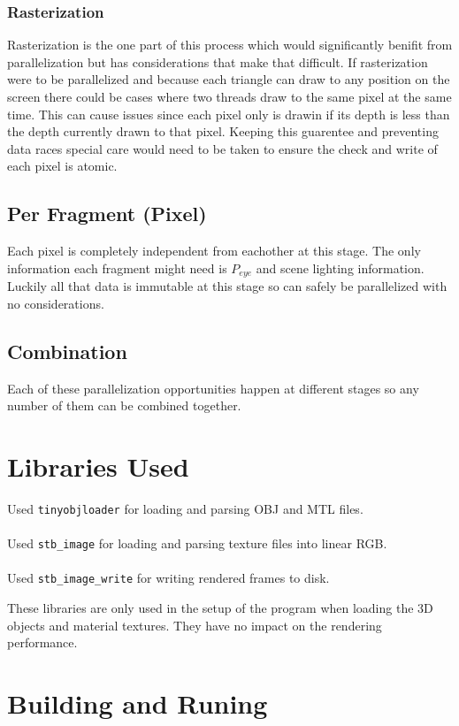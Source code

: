 \documentclass[12pt]{article}
\begin{document}
\subsubsection{Rasterization}
Rasterization is the one part of this process which would significantly benifit from parallelization but has considerations that make that difficult. If rasterization were to be parallelized and because each triangle can draw to any position on the screen there could be cases where two threads draw to the same pixel at the same time. This can cause issues since each pixel only is drawin if its depth is less than the depth currently drawn to that pixel. Keeping this guarentee and preventing data races special care would need to be taken to ensure the check and write of each pixel is atomic.

\subsection{Per Fragment (Pixel)}
Each pixel is completely independent from eachother at this stage. The only information each fragment might need is $P_{eye}$ and scene lighting information. Luckily all that data is immutable at this stage so can safely be parallelized with no considerations.

\subsection{Combination}
Each of these parallelization opportunities happen at different stages so any number of them can be combined together.

\section{Libraries Used}

Used \texttt{tinyobjloader}\cite{tinyobjloader} for loading and parsing OBJ and MTL files.\\
\\
Used \texttt{stb\_image}\cite{stb-image} for loading and parsing texture files into linear RGB.\\
\\
Used \texttt{stb\_image\_write}\cite{stb-image-write} for writing rendered frames to disk.

These libraries are only used in the setup of the program when loading the 3D objects and material textures. They have no impact on the rendering performance.

\section{Building and Runing}
\end{document}
